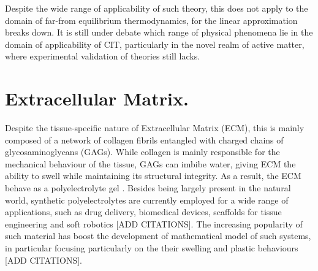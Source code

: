 \documentclass[runningheads]{llncs}
\begin{document}
Despite the wide range of applicability of such theory, this does not apply to the domain of far-from equilibrium thermodynamics, for the linear approximation breaks down. It is still under debate which range of physical phenomena lie in the domain of applicability of CIT, particularly in the novel realm of active matter, where experimental validation of theories still lacks.

\section{Extracellular Matrix.}
\label{ECMcomp}
Despite the tissue-specific nature of Extracellular Matrix (ECM), this is mainly composed of a network of collagen fibrils entangled with charged chains of glycosaminoglycans (GAGs). While collagen is mainly responsible for the mechanical behaviour of the tissue, GAGs can imbibe water, giving ECM the ability to swell while maintaining its structural integrity. As a result, the ECM behave as a polyelectrolyte gel \cite{ecm1,ecm2}. Besides being largely present in the natural world, synthetic polyelectrolytes are currently employed for a wide range of applications, such as drug delivery, biomedical devices, scaffolds for tissue engineering and soft robotics [ADD CITATIONS]. The increasing popularity of such material has boost the development of mathematical model of such systems, in particular focusing particularly on the their swelling and plastic behaviours [ADD CITATIONS].
\end{document}

